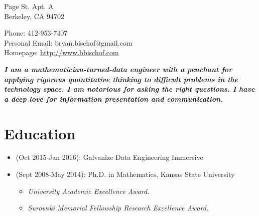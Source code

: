 \documentclass[a4paper,10pt,notitlepage]{article}
\begin{document}
\begin{multicols}{2}{
 Page St. Apt. A\\
Berkeley, CA 94702

\noindent Phone: 412-953-7407\\
Personal Email: bryan.bischof@gmail.com\\
Homepage: \url{http://www.bbischof.com}
}
\end{multicols}

\noindent \textit{\textbf{I am a mathematician-turned-data engineer with a penchant for applying rigorous quantitative thinking to difficult problems in the technology space. I am notorious for asking the right questions. I have a deep love for information presentation and communication. }}


\vspace{-10pt}\section*{Education}
\begin{itemize}
  \vspace{-5pt}\item  (Oct 2015-Jan 2016): Galvanize Data Engineering Immersive
  \vspace{-5pt}\item  (Sept 2008-May 2014): Ph.D. in Mathematics, Kansas State University
    \begin{itemize}
     \vspace{-5pt}\item \textit{University Academic Excellence Award.}
     \vspace{-5pt}\item \textit{Surowski Memorial Fellowship Research Excellence Award.}
     \end{itemize}
\end{itemize}
\end{document}
